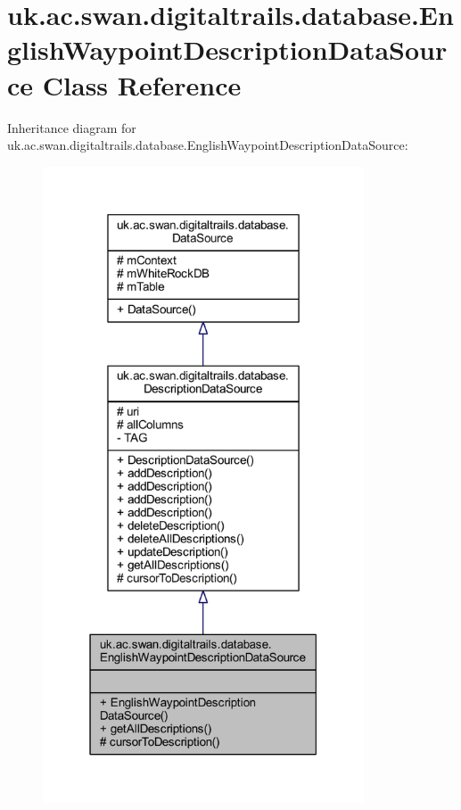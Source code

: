 \hypertarget{classuk_1_1ac_1_1swan_1_1digitaltrails_1_1database_1_1_english_waypoint_description_data_source}{\section{uk.\+ac.\+swan.\+digitaltrails.\+database.\+English\+Waypoint\+Description\+Data\+Source Class Reference}
\label{classuk_1_1ac_1_1swan_1_1digitaltrails_1_1database_1_1_english_waypoint_description_data_source}
}


Inheritance diagram for uk.\+ac.\+swan.\+digitaltrails.\+database.\+English\+Waypoint\+Description\+Data\+Source\+:
\nopagebreak
\begin{figure}[H]
\begin{center}
\leavevmode
\includegraphics[width=270pt]{classuk_1_1ac_1_1swan_1_1digitaltrails_1_1database_1_1_english_waypoint_description_data_source__inherit__graph}
\end{center}
\end{figure}


